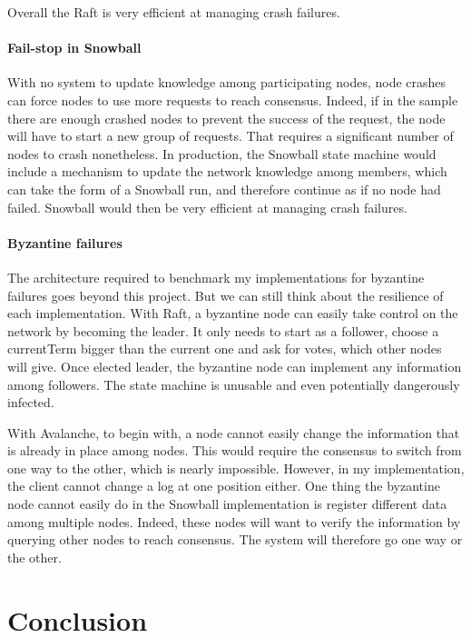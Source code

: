 \documentclass[11pt, twocolumn]{article}
\begin{document}
Overall the Raft is very efficient at managing crash failures.

\paragraph{Fail-stop in Snowball}
With no system to update knowledge among participating nodes, node crashes can force nodes to use more requests to reach consensus.
Indeed, if in the sample there are enough crashed nodes to prevent the success of the request, the node will have to start a new group of requests. That requires a significant number of nodes to crash nonetheless.
In production, the Snowball state machine would include a mechanism to update the network knowledge among members, which can take the form of a Snowball run, and therefore continue as if no node had failed.
Snowball would then be very efficient at managing crash failures.

\paragraph{Byzantine failures}
The architecture required to benchmark my implementations for byzantine failures goes beyond this project. But we can still think about the resilience of each implementation.
With Raft, a byzantine node can easily take control on the network by becoming the leader. It only needs to start as a follower, choose a currentTerm bigger than the current one and ask for votes, which other nodes will give.
Once elected leader, the byzantine node can implement any information among followers. The state machine is unusable and even potentially dangerously infected.

With Avalanche, to begin with, a node cannot easily change the information that is already in place among nodes. This would require the consensus to switch from one way to the other, which is nearly impossible. However, in my implementation, the client cannot change a log at one position either.
One thing the byzantine node cannot easily do in the Snowball implementation is register different data among multiple nodes. Indeed, these nodes will want to verify the information by querying other nodes to reach consensus. The system will therefore go one way or the other.

\section{Conclusion}
\end{document}

